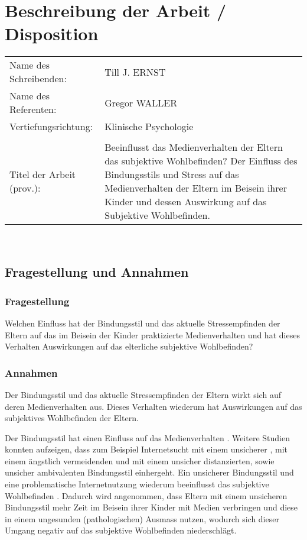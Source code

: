 \section{Beschreibung der Arbeit / Disposition}
\hspace{-0.9cm} %
\begin{tabular}{p{} p{10cm}} 
Name des Schreibenden: & Till J. ERNST \\ 
Name des Referenten: & Gregor WALLER \\
Vertiefungsrichtung: & Klinische Psychologie \\
& \\
Titel der Arbeit (prov.): & Beeinflusst das Medienverhalten der Eltern das subjektive Wohlbefinden? Der Einfluss des Bindungsstils und Stress auf das Medienverhalten der Eltern im Beisein ihrer Kinder und dessen Auswirkung auf das Subjektive Wohlbefinden. \\
\end{tabular} \\
\subsection{Fragestellung und Annahmen}
\subsubsection{Fragestellung}
Welchen Einfluss hat der Bindungsstil und das aktuelle Stressempfinden der Eltern auf das im Beisein der Kinder praktizierte Medienverhalten und hat dieses Verhalten Auswirkungen auf das elterliche subjektive Wohlbefinden?
\subsubsection{Annahmen}
Der Bindungsstil und das aktuelle Stressempfinden der Eltern wirkt sich auf deren Medienverhalten aus. Dieses Verhalten wiederum hat Auswirkungen auf das subjektives Wohlbefinden der Eltern.

Der Bindungsstil hat einen Einfluss auf das Medienverhalten \cite{Lin2015, Monacis2017}. Weitere Studien konnten aufzeigen, dass zum Beispiel Internetsucht mit einem unsicherer \cite{Lin2011, Severino2013}, mit einem ängstlich vermeidenden \cite{Shin2011} und mit einem unsicher distanzierten, sowie unsicher ambivalenten Bindungsstil \cite{Odaci2014} einhergeht. Ein unsicherer Bindungsstil und eine problematische Internetnutzung wiederum beeinflusst das subjektive Wohlbefinden \cite{Odaci2014}.	 
Dadurch wird angenommen, dass Eltern mit einem unsicheren Bindungsstil mehr Zeit im Beisein ihrer Kinder mit Medien verbringen und diese in einem ungesunden (pathologischen) Ausmass nutzen, wodurch sich dieser Umgang negativ auf das subjektive Wohlbefinden niederschlägt.  

